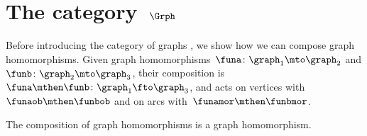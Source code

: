 
\section[The category~$\Grph$]{The category~$\Grph$}
\label{sec:cat-grph}

Before introducing the category of graphs \Grph, we show how we can compose graph homomorphisms.
Given graph homomorphisms~$\funa\colon \graph_1\mto \graph_2$ and $\funb\colon \graph_2\mto \graph_3$, their composition is $\funa\mthen \funb \colon \graph_1 \fto \graph_3$, and acts on vertices with~$\funaob \mthen \funbob$ and on arcs with~$\funamor \mthen \funbmor$.

\begin{lemma}
    \label{lem:composing_homomorphisms}
    The composition of graph homomorphisms is a graph homomorphism.
\end{lemma}
%
